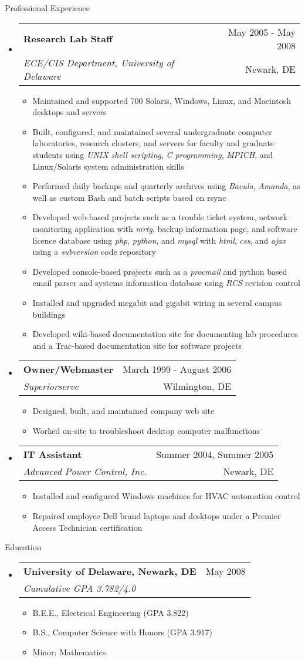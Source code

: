 \documentclass[letterpaper,10pt]{article}
\makeatletter
\newenvironment{ressection}[1]{
	\vspace{4pt}
	{\fontfamily{phv}\selectfont\Large#1}
	\begin{itemize}
	\vspace{3pt}
}{
	\end{itemize}
}
\newcommand{\ressubitem}[1]{
	\vspace{-1pt}
	\item \begin{flushleft} #1 \end{flushleft}
}
\newcommand{\resbigitem}[4]{
	\vspace{-5pt}
	\item
	\begin{tabular*}{6in}{l@{\extracolsep{\fill}}r}
		\textbf{#1} & #2 \\
		\textit{#3} & #4\\
	\end{tabular*}
}
\newenvironment{ressubsec}[4]{
	\resbigitem{#1}{#2}{#3}{#4}
	\vspace{-2pt}
	\begin{itemize}
}{
	\end{itemize}
}
\makeatother
\begin{document}
\begin{ressection}{Professional Experience}
	\begin{ressubsec}{Research Lab Staff}{May 2005 - May 2008}{ECE/CIS Department, University of Delaware}{Newark, DE}
		\ressubitem{Maintained and supported 700 Solaris, Windows, Linux, and Macintosh desktops and servers}
		\ressubitem{Built, configured, and maintained several undergraduate computer laboratories, research clusters, and servers for faculty and graduate students using \textit{UNIX shell scripting}, \textit{C programming}, \textit{MPICH}, and Linux/Solaris system administration skills}
		\ressubitem{Performed daily backups and quarterly archives using \textit{Bacula}, \textit{Amanda}, as well as custom Bash and batch scripts based on rsync}
		\ressubitem{Developed web-based projects such as a trouble ticket system, network monitoring application with \textit{mrtg}, backup information page, and software licence database using \textit{php}, \textit{python}, and \textit{mysql} with \textit{html}, \textit{css}, and \textit{ajax} using a \textit{subversion} code repository}
		\ressubitem{Developed console-based projects such as a \textit{procmail} and python based email parser and systems information database using \textit{RCS} revision control}
		\ressubitem{Installed and upgraded megabit and gigabit wiring in several campus buildings}
		\ressubitem{Developed wiki-based documentation site for documenting lab procedures and a Trac-based documentation site for software projects}
	\end{ressubsec}

	\begin{ressubsec}{Owner/Webmaster}{March 1999 - August 2006}{Superiorserve}{Wilmington, DE}
		\ressubitem{Designed, built, and maintained company web site}
		\ressubitem{Worked on-site to troubleshoot desktop computer malfunctions}
	\end{ressubsec}

	\begin{ressubsec}{IT Assistant}{Summer 2004, Summer 2005}{Advanced Power Control, Inc.}{Newark, DE}
		\ressubitem{Installed and configured Windows machines for HVAC automation control}
		\ressubitem{Repaired employee Dell brand laptops and desktops under a Premier Access Technician certification}
	\end{ressubsec}
\end{ressection}

\begin{ressection}{Education}
	\begin{ressubsec}{University of Delaware, Newark, DE}{May 2008}{Cumulative GPA 3.782/4.0}{}
		\ressubitem{B.E.E., Electrical Engineering (GPA 3.822)}
		\ressubitem{B.S., Computer Science with Honors (GPA 3.917)}
		\ressubitem{Minor: Mathematics}
	\end{ressubsec}
\end{ressection}
\end{document}

